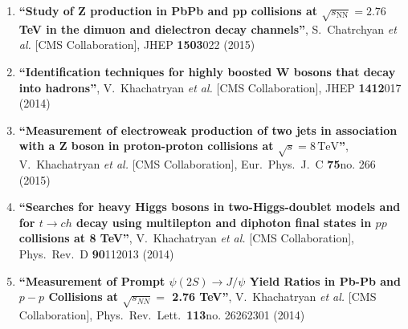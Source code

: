 \begin{enumerate}
\item%
{\bf ``Study of Z production in PbPb and pp collisions at $ \sqrt{s_{\mathrm{NN}}}=2.76 $ TeV in the dimuon and dielectron decay channels''}, 
  S.~Chatrchyan {\it et al.}  [CMS Collaboration], 
JHEP {\bf 1503}022 (2015) %


\item%
{\bf ``Identification techniques for highly boosted W bosons that decay into hadrons''}, 
  V.~Khachatryan {\it et al.}  [CMS Collaboration], 
JHEP {\bf 1412}017 (2014) %


\item%
{\bf ``Measurement of electroweak production of two jets in association with a Z boson in proton-proton collisions at $\sqrt{s}=8\,\text {TeV}$''}, 
  V.~Khachatryan {\it et al.}  [CMS Collaboration], 
Eur.\ Phys.\ J.\ C {\bf 75}no. 266 (2015) %


\item%
{\bf ``Searches for heavy Higgs bosons in two-Higgs-doublet models and for $t\rightarrow ch$ decay using multilepton and diphoton final states in $pp$ collisions at 8 TeV''}, 
  V.~Khachatryan {\it et al.}  [CMS Collaboration], 
Phys.\ Rev.\ D {\bf 90}112013 (2014) %


\item%
{\bf ``Measurement of Prompt $\psi(2S) \to J/\psi$ Yield Ratios in Pb-Pb and $p-p$ Collisions at $\sqrt {s_{NN}}=$ 2.76 TeV''}, 
  V.~Khachatryan {\it et al.}  [CMS Collaboration], 
Phys.\ Rev.\ Lett.\  {\bf 113}no. 26262301 (2014) %



\end{enumerate}
